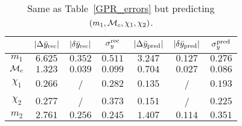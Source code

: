 \begin{table}
  \caption{\label{GPR_errors_temp} Same as Table~\ref{GPR_errors} but predicting $(m_1, {\cal{M}}_c, \chi_1, \chi_2)$. }
  \begin{center}
  \begin{tabular}{c|ccc|ccc}
  \hline\hline
  & $|\Delta \bar{y}_{\rm rec}|$  & $|\delta \bar{y}_{\rm rec}|$  & $\sigma_y^{\rm rec}$ & 
     $|\Delta \bar{y}_{\rm pred}|$ & $|\delta \bar{y}_{\rm pred}|$ & $\sigma_y^{\rm pred}$ \\
  \hline\hline
$m_1$          & $6.625$ & $0.352$ & $0.511$ & $3.247$ & $0.127$ & $0.276$ \\
${\cal{M}}_c$  & $1.323$ & $0.039$ & $0.099$ & $0.704$ & $0.027$ & $0.086$ \\
$\chi_1$       & $0.266$ &  /  & $0.282$ & $0.135$ &  /  & $0.193$ \\
$\chi_2$       & $0.277$ &  /  & $0.373$ & $0.151$ &  /  & $0.225$ \\
\hline
$m_2$          & $2.761$ & $0.256$ & $0.245$ & $1.407$ & $0.114$ & $0.351$ \\
  \hline\hline
  \end{tabular}
  \end{center}
\end{table}
